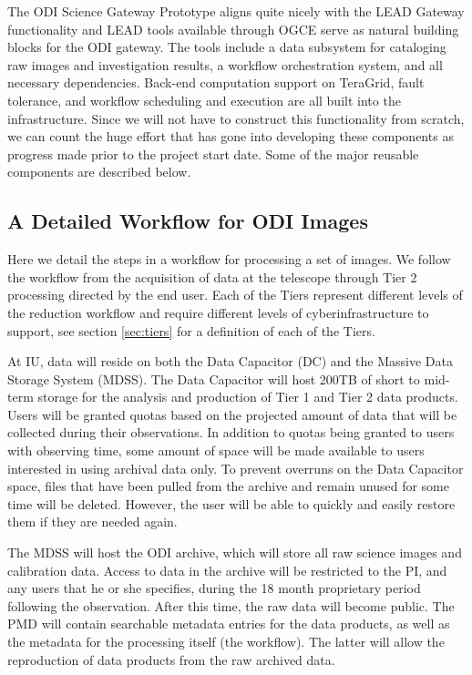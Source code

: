 \documentclass[10pt,conference]{IEEEtran}
\begin{document}
The ODI Science Gateway Prototype aligns quite nicely with the LEAD Gateway functionality and LEAD tools available through OGCE serve as natural building blocks for the ODI gateway. The tools include a data subsystem for cataloging raw images and investigation results, a workflow orchestration system, and all necessary dependencies. Back-end computation support on TeraGrid, fault tolerance, and workflow scheduling and execution are all built into the infrastructure. Since we will not have to construct this functionality from scratch, we can count the huge effort that has gone into developing these components as progress made prior to the project start date. Some of the major reusable components are described below.

\subsection{A Detailed Workflow for ODI Images}\label{sec:workflow}

Here we detail the steps in a workflow for processing a set of images. We follow the workflow from the acquisition of data at the telescope through Tier 2 processing directed by the end user. Each of the Tiers represent different levels of the reduction workflow and require different levels of cyberinfrastructure to support, see section \ref{sec:tiers} for a definition of each of the Tiers.

At IU, data will reside on both the Data Capacitor (DC) and the Massive Data Storage System (MDSS).
The Data Capacitor will host 200TB of short to mid-term storage for the analysis and production of Tier 1 and Tier 2 data products. Users will be granted quotas based on the projected amount of data that will be collected during their observations. In addition to quotas being granted to users with observing time, some amount of space will be made available to users interested in using archival data only. To prevent overruns on the Data Capacitor space, files that have been pulled from the archive and remain unused for some time will be deleted. However, the user will be able to quickly and easily restore them if they are needed again.

The MDSS will host the ODI archive, which will store all raw science images and calibration data.
Access to data in the archive will be restricted to the PI, and any users that he or she specifies, during the 18 month proprietary period following the observation. After this time, the raw data will become public. The PMD will contain searchable metadata entries for the data products, as well as the metadata for the processing itself (the workflow). The latter will allow the reproduction of data products from the raw archived data. 
\end{document}
